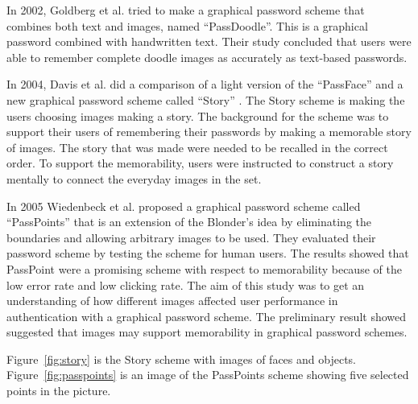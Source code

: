   In 2002, Goldberg et al. \cite{PassDoodle} tried to make a graphical password scheme that combines both text and images, named ``PassDoodle''. This is a graphical password combined with handwritten text. Their study concluded that users were able to remember complete doodle images as accurately as text-based passwords.

  In 2004, Davis et al. did a comparison of a light version of the ``PassFace'' and a new graphical password scheme called ``Story'' \cite{Davis}. The Story scheme is making the users choosing images making a story. The background for the scheme was to support their users of remembering their passwords by making a memorable story of images. The story that was made were needed to be recalled in the correct order. To support the memorability, users were instructed to construct a story mentally to connect the everyday images in the set.

  In 2005 Wiedenbeck et al. proposed a graphical password scheme called ``PassPoints'' \cite{Wiedenbeck2} that is an  extension of the Blonder's \cite{Blonder} idea by eliminating the boundaries and allowing arbitrary images to be used. They evaluated their password scheme by testing the scheme for human users. The results showed that PassPoint were a promising scheme with respect to memorability because of the low error rate and low clicking rate.
  The aim of this study was to get an understanding of how different images affected user performance in authentication with a graphical password scheme. The preliminary result showed suggested that images may support memorability in graphical password schemes.

  Figure~\ref{fig:story} is the Story scheme with images of faces and objects. Figure~\ref{fig:passpoints} is an image of the PassPoints scheme showing five selected points in the picture.

